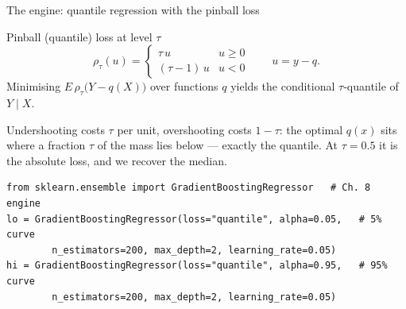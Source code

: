 \documentclass[aspectratio=169,11pt]{beamer}
\begin{document}
\begin{frame}[fragile]{The engine: quantile regression with the pinball loss}
  \begin{block}{Pinball (quantile) loss at level $\tau$}
    \[
      \rho_\tau(u) =
      \begin{cases}
        \tau\, u & u \ge 0 \\
        (\tau - 1)\, u & u < 0
      \end{cases}
      \qquad u = y - q .
    \]
    Minimising $E\,\rho_\tau\big(Y - q(X)\big)$ over functions $q$ yields the
    conditional $\tau$-quantile of $Y \mid X$.
  \end{block}
  \begin{readme}
    Undershooting costs $\tau$ per unit, overshooting costs $1 - \tau$: the optimal
    $q(x)$ sits where a fraction $\tau$ of the mass lies below --- exactly the
    quantile. At $\tau = 0.5$ it is the absolute loss, and we recover the median.
  \end{readme}
  \begin{lstlisting}
from sklearn.ensemble import GradientBoostingRegressor   # Ch. 8 engine
lo = GradientBoostingRegressor(loss="quantile", alpha=0.05,   # 5% curve
        n_estimators=200, max_depth=2, learning_rate=0.05)
hi = GradientBoostingRegressor(loss="quantile", alpha=0.95,   # 95% curve
        n_estimators=200, max_depth=2, learning_rate=0.05)
  \end{lstlisting}
\end{frame}
\end{document}
